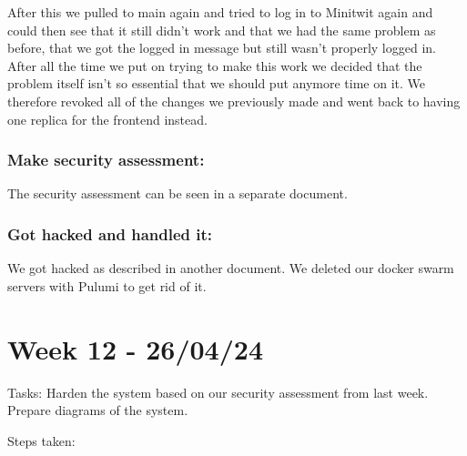 \begin{Shaded}
\begin{Highlighting}[]

\AttributeTok{  }\KeywordTok{:}
\AttributeTok{    }\KeywordTok{:}
\AttributeTok{    }\KeywordTok{:}
\AttributeTok{    }\KeywordTok{:}
\AttributeTok{      }\KeywordTok{{-}}
\AttributeTok{    }\KeywordTok{:}
\AttributeTok{      }\KeywordTok{{-}}\AttributeTok{ }
\end{Highlighting}
\end{Shaded}

After this we pulled to main again and tried to log in to Minitwit again and could then see that it still didn't work and that we had the same problem as before, that we got the logged in message but still wasn't properly logged in. After all the time we put on trying to make this work we decided that the problem itself isn't so essential that we should put anymore time on it. We therefore revoked all of the changes we previously made and went back to having one replica for the frontend instead.

\subsubsection{Make security assessment:}
\label{log:make-security-assessment}

The security assessment can be seen in a separate document.

\subsubsection{Got hacked and handled it:}
\label{log:got-hacked-and-handled-it}

We got hacked as described in another document. We deleted our docker
swarm servers with Pulumi to get rid of it.

\section{Week 12 - 26/04/24}
\label{week12}

Tasks: Harden the system based on our security assessment from last week. Prepare diagrams of the system.

Steps taken:

